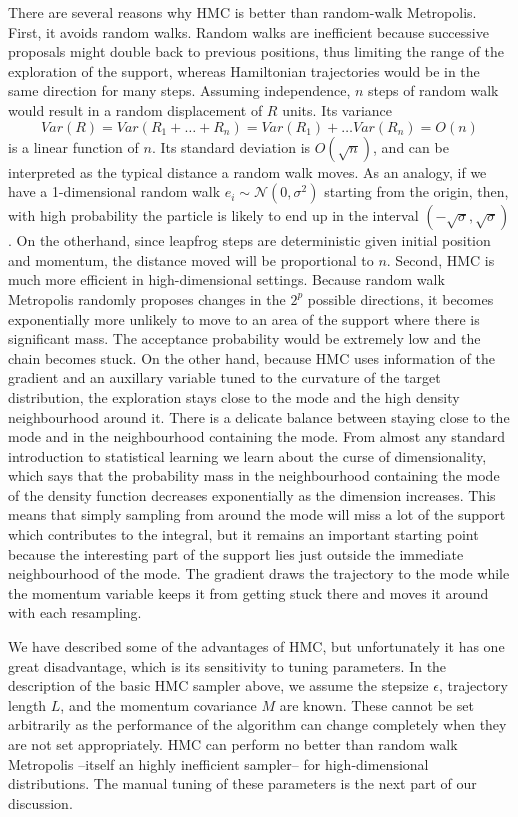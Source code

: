 \documentclass{book}
\begin{document}
\begin{enumerate}
There are several reasons why HMC is better than random-walk Metropolis. First,
it avoids random walks. Random walks are inefficient because successive
proposals might double back to previous positions, thus limiting the range of
the exploration of the support, whereas Hamiltonian trajectories would be in the
same direction for many steps. Assuming independence, $n$ steps of random walk
would result in a random displacement of $R$ units. Its variance  
\[Var(R) = Var(R_1 + \dots + R_n) = Var(R_1) + \dots Var(R_n) = O(n) \]
is a linear function of $n$. Its standard deviation is $O(\sqrt{n})$, and can be
interpreted as the typical distance a random walk moves. As an analogy, if we
have a 1-dimensional random walk $e_i \sim \mathcal{N}(0,\sigma^2)$ starting from
the origin, then,  with high probability the particle is likely to end up in the
interval $(-\sqrt{\sigma},\sqrt{\sigma})$. 
On the otherhand, since leapfrog steps are deterministic given initial position
and momentum, the distance moved will be proportional to $n$. 
Second, HMC is much more efficient in
high-dimensional settings. Because random walk Metropolis randomly proposes changes in
the $2^p$ possible directions, it becomes exponentially more unlikely to move
to an area of the support where there is significant mass. The acceptance
probability would be extremely low and the chain becomes stuck. On the other
hand, because HMC uses information of the gradient and an auxillary variable
tuned to the curvature of the target distribution, the exploration stays close
to the mode and the high density neighbourhood around it. There is a delicate
balance between staying close to the mode and in the neighbourhood containing
the mode. From almost any standard introduction to statistical learning \cite{friedman2001elements} we learn about the curse of dimensionality, which says that the probability mass in the neighbourhood containing the mode of the density function decreases exponentially as the dimension increases. This means that simply sampling from around the mode will miss a lot of the support which contributes to the integral, but it remains an important starting point because the interesting part of the support lies just outside the immediate neighbourhood of the mode. The gradient draws the
trajectory to
the mode while the momentum variable keeps it from getting stuck there and moves it around with each resampling.

We have described some of the advantages of HMC, but unfortunately it has one great disadvantage, which is its sensitivity to tuning parameters. 
In the description of the basic HMC sampler above, we assume the stepsize $\epsilon$, trajectory length $L$, and the momentum covariance $M$ are known. These cannot be set arbitrarily as the performance of the algorithm can change completely when they are not set appropriately. HMC can perform no better than random walk Metropolis --itself an highly inefficient sampler-- for high-dimensional distributions. The manual tuning of these parameters is the next part of our discussion. 


\end{enumerate}
\end{document}
